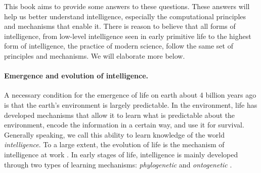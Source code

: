 \documentclass[../../book-main.tex]{subfiles}
\begin{document}
This book aims to provide some answers to these questions. These answers will help us better understand intelligence, especially the computational principles and mechanisms that enable it. There is reason to believe that all forms of intelligence, from low-level intelligence seen in early primitive life to the highest form of intelligence, the practice of modern science, follow the same set of principles and mechanisms. We will elaborate more below.

\paragraph{Emergence and evolution of intelligence.}

A necessary condition for the emergence of life on earth about 4 billion years ago is that the earth's environment is largely predictable. In the environment, life has developed mechanisms that allow it to learn what is predictable about the environment, encode the information in a certain way, and use it for survival. Generally speaking, we call this ability to learn knowledge of the world {\em intelligence}. To a large extent, the evolution of life is the mechanism of intelligence at work \cite{Bennett-2023}. In early stages of life, intelligence is mainly developed through two types of learning mechanisms: {\em phylogenetic} and {\em ontogenetic} \cite{Wiener-Cybernetics-1961}.%
\end{document}
